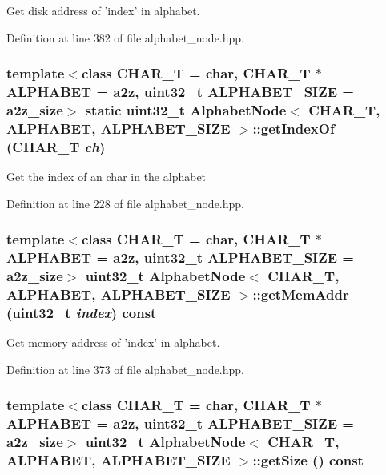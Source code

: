 Get disk address of 'index' in alphabet. 

Definition at line 382 of file alphabet\_\-node.hpp.\hypertarget{classAlphabetNode_70a1bce2cd115da3c90b11034f74f8c1}{
\subsubsection[{getIndexOf}]{\setlength{\rightskip}{0pt plus 5cm}template$<$class CHAR\_\-T  = char, CHAR\_\-T $\ast$ ALPHABET = a2z, uint32\_\-t ALPHABET\_\-SIZE = a2z\_\-size$>$ static uint32\_\-t {\bf AlphabetNode}$<$ CHAR\_\-T, ALPHABET, ALPHABET\_\-SIZE $>$::getIndexOf (CHAR\_\-T {\em ch})}}
\label{classAlphabetNode_70a1bce2cd115da3c90b11034f74f8c1}


Get the index of an char in the alphabet 

Definition at line 228 of file alphabet\_\-node.hpp.\hypertarget{classAlphabetNode_c43596bdd6a74609449bce2b795f4c7c}{
\subsubsection[{getMemAddr}]{\setlength{\rightskip}{0pt plus 5cm}template$<$class CHAR\_\-T  = char, CHAR\_\-T $\ast$ ALPHABET = a2z, uint32\_\-t ALPHABET\_\-SIZE = a2z\_\-size$>$ uint32\_\-t {\bf AlphabetNode}$<$ CHAR\_\-T, ALPHABET, ALPHABET\_\-SIZE $>$::getMemAddr (uint32\_\-t {\em index}) const}}
\label{classAlphabetNode_c43596bdd6a74609449bce2b795f4c7c}


Get memory address of 'index' in alphabet. 

Definition at line 373 of file alphabet\_\-node.hpp.\hypertarget{classAlphabetNode_87e35e0c031ef4ce3d007fcc97c74105}{
\subsubsection[{getSize}]{\setlength{\rightskip}{0pt plus 5cm}template$<$class CHAR\_\-T  = char, CHAR\_\-T $\ast$ ALPHABET = a2z, uint32\_\-t ALPHABET\_\-SIZE = a2z\_\-size$>$ uint32\_\-t {\bf AlphabetNode}$<$ CHAR\_\-T, ALPHABET, ALPHABET\_\-SIZE $>$::getSize () const}}
\label{classAlphabetNode_87e35e0c031ef4ce3d007fcc97c74105}


